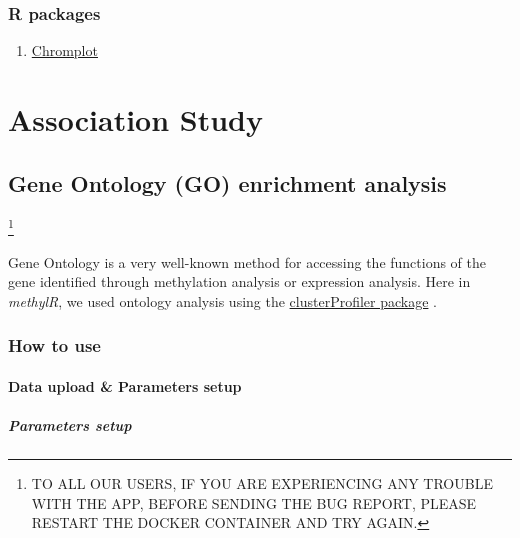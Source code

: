 \documentclass[
  a4paper,
  oneside,
  open=any]{scrreport}
\providecommand{\tightlist}{%
  \setlength{\itemsep}{0pt}\setlength{\parskip}{0pt}}\usepackage{longtable,booktabs,array}
\begin{document}
\hypertarget{r-packages}{%
\section{R packages}\label{r-packages}}

\begin{enumerate}
\def\labelenumi{\arabic{enumi}.}
\tightlist
\item
  \href{https://www.bioconductor.org/packages/release/bioc/vignettes/chromPlot/inst/doc/chromPlot.pdf}{Chromplot}
\end{enumerate}

\part{Association Study}

\hypertarget{sec-go}{%
\chapter{Gene Ontology (GO) enrichment analysis}\label{sec-go}}

\footnote{TO ALL OUR USERS, IF YOU ARE EXPERIENCING ANY TROUBLE WITH THE
  APP, BEFORE SENDING THE BUG REPORT, PLEASE RESTART THE DOCKER
  CONTAINER AND TRY AGAIN.}

Gene Ontology is a very well-known method for accessing the functions of
the gene identified through methylation analysis or expression analysis.
Here in \emph{methylR}, we used ontology analysis using the
\href{https://bioconductor.org/packages/release/bioc/html/clusterProfiler.html}{clusterProfiler
package} \autocite{yu2012clusterprofiler,wu2021clusterprofiler}.

\hypertarget{how-to-use-7}{%
\section{How to use}\label{how-to-use-7}}

\hypertarget{data-upload-parameters-setup-4}{%
\subsection{Data upload \& Parameters
setup}\label{data-upload-parameters-setup-4}}

\hypertarget{parameters-setup-1}{%
\subsubsection{Parameters setup}\label{parameters-setup-1}}
\end{document}
